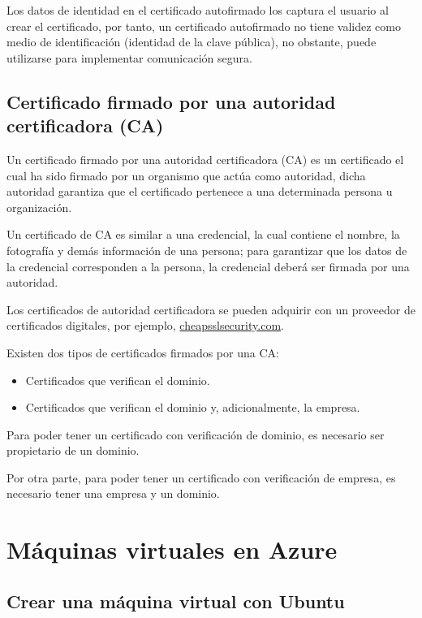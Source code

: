 Los datos de identidad en el certificado autofirmado los captura el usuario al crear el certificado, por tanto, un certificado autofirmado no tiene validez como medio de identificación (identidad de la clave pública), no obstante, puede utilizarse para implementar comunicación segura.

\section{Certificado firmado por una autoridad certificadora (CA)}

Un certificado firmado por una autoridad certificadora (CA) es un certificado el cual ha sido firmado por un organismo que actúa como autoridad, dicha autoridad garantiza que el certificado pertenece a una determinada persona u organización.

Un certificado de CA es similar a una credencial, la cual contiene el nombre, la fotografía y demás información de una persona; para garantizar que los datos de la credencial corresponden a la persona, la credencial deberá ser firmada por una autoridad.

Los certificados de autoridad certificadora se pueden adquirir con un proveedor de certificados digitales, por ejemplo, \href{https://cheapsslsecurity.com}{cheapsslsecurity.com}.

Existen dos tipos de certificados firmados por una CA:

\begin{itemize}

\item Certificados que verifican el dominio.

\item Certificados que verifican el dominio y, adicionalmente, la empresa.

\end{itemize}

Para poder tener un certificado con verificación de dominio, es necesario ser propietario de un dominio.

Por otra parte, para poder tener un certificado con verificación de empresa, es necesario tener una empresa y un dominio.

\chapter{Máquinas virtuales en Azure}

\section{Crear una máquina virtual con Ubuntu}

